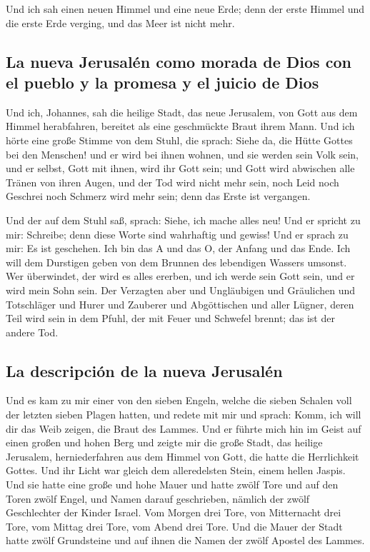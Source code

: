  Und ich sah einen neuen Himmel und eine neue Erde; denn
der erste Himmel und die erste Erde verging, und das Meer ist nicht
mehr.

\hypertarget{la-nueva-jerusaluxe9n-como-morada-de-dios-con-el-pueblo-y-la-promesa-y-el-juicio-de-dios}{%
\subsection{La nueva Jerusalén como morada de Dios con el pueblo y la
promesa y el juicio de
Dios}\label{la-nueva-jerusaluxe9n-como-morada-de-dios-con-el-pueblo-y-la-promesa-y-el-juicio-de-dios}}

 Und ich, Johannes, sah die heilige Stadt, das neue
Jerusalem, von Gott aus dem Himmel herabfahren, bereitet als eine
geschmückte Braut ihrem Mann.  Und ich hörte eine große
Stimme von dem Stuhl, die sprach: Siehe da, die Hütte Gottes bei den
Menschen! und er wird bei ihnen wohnen, und sie werden sein Volk sein,
und er selbst, Gott mit ihnen, wird ihr Gott sein;  und
Gott wird abwischen alle Tränen von ihren Augen, und der Tod wird nicht
mehr sein, noch Leid noch Geschrei noch Schmerz wird mehr sein; denn das
Erste ist vergangen.

 Und der auf dem Stuhl saß, sprach: Siehe, ich mache alles
neu! Und er spricht zu mir: Schreibe; denn diese Worte sind wahrhaftig
und gewiss!  Und er sprach zu mir: Es ist geschehen. Ich
bin das A und das O, der Anfang und das Ende. Ich will dem Durstigen
geben von dem Brunnen des lebendigen Wassers umsonst.  Wer
überwindet, der wird es alles ererben, und ich werde sein Gott sein, und
er wird mein Sohn sein.  Der Verzagten aber und
Ungläubigen und Gräulichen und Totschläger und Hurer und Zauberer und
Abgöttischen und aller Lügner, deren Teil wird sein in dem Pfuhl, der
mit Feuer und Schwefel brennt; das ist der andere Tod.

\hypertarget{la-descripciuxf3n-de-la-nueva-jerusaluxe9n}{%
\subsection{La descripción de la nueva
Jerusalén}\label{la-descripciuxf3n-de-la-nueva-jerusaluxe9n}}

 Und es kam zu mir einer von den sieben Engeln, welche die
sieben Schalen voll der letzten sieben Plagen hatten, und redete mit mir
und sprach: Komm, ich will dir das Weib zeigen, die Braut des Lammes.
 Und er führte mich hin im Geist auf einen großen und
hohen Berg und zeigte mir die große Stadt, das heilige Jerusalem,
herniederfahren aus dem Himmel von Gott,  die hatte die
Herrlichkeit Gottes. Und ihr Licht war gleich dem alleredelsten Stein,
einem hellen Jaspis.  Und sie hatte eine große und hohe
Mauer und hatte zwölf Tore und auf den Toren zwölf Engel, und Namen
darauf geschrieben, nämlich der zwölf Geschlechter der Kinder Israel.
 Vom Morgen drei Tore, von Mitternacht drei Tore, vom
Mittag drei Tore, vom Abend drei Tore.  Und die Mauer der
Stadt hatte zwölf Grundsteine und auf ihnen die Namen der zwölf Apostel
des Lammes.

